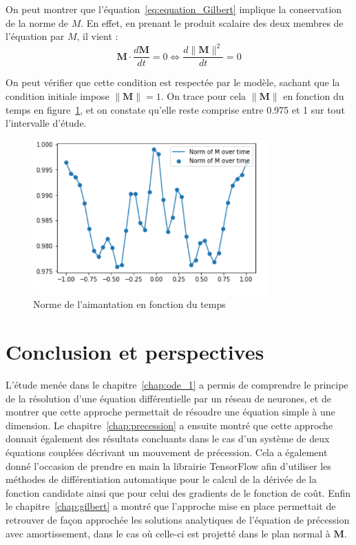 \documentclass[12pt]{report}
\begin{document}
On peut montrer que l'équation~\ref{eq:equation_Gilbert} implique la conservation de la norme de $M$. 
En effet, en prenant le produit scalaire des deux membres de l'équation par $M$, il vient :
\begin{equation}
    \bm{M} \cdot \frac{d\bm{M}}{dt} = 0 \Leftrightarrow 
    \frac{d\lVert \bm{M} \rVert ^2}{dt} = 0 
\label{eq:conservation_norme_M}
\end{equation}

On peut vérifier que cette condition est respectée par le modèle, sachant que la condition initiale impose $\lVert \bm{M} \rVert=1$.
On trace pour cela $\lVert \bm{M} \rVert$ en fonction du temps en figure~\ref{fig:norme_de_M}, et on constate qu'elle reste comprise entre 0.975 et 1 sur tout l'intervalle d'étude.

\begin{figure}
    \centering
    \includegraphics[width=0.8\textwidth]{norm over time.PNG}
    \caption{Norme de l'aimantation en fonction du temps}
    \label{fig:norme_de_M}
\end{figure}


\chapter{Conclusion et perspectives}
\label{chap:conclusion}

L'étude menée dans le chapitre~\ref{chap:ode_1} a permis de comprendre le principe de la résolution d'une équation différentielle par un réseau de neurones, et de montrer que cette approche permettait de résoudre une équation simple à une dimension.
Le chapitre~\ref{chap:precession} a ensuite montré que cette approche donnait également des résultats concluants dans le cas d'un système de deux équations couplées décrivant un mouvement de précession.
Cela a également donné l'occasion de prendre en main la librairie TensorFlow afin d'utiliser les méthodes de différentiation automatique pour le calcul de la dérivée de la fonction candidate ainsi que pour celui des gradients de le fonction de coût.
Enfin le chapitre~\ref{chap:gilbert} a montré que l'approche mise en place permettait de retrouver de façon approchée les solutions analytiques de l'équation de précession avec amortissement, dans le cas où celle-ci est projetté dans le plan normal à $\bm M$.
\end{document}
